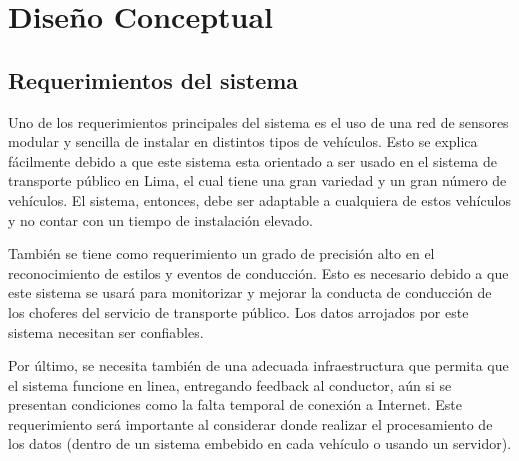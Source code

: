 \chapter{Diseño Conceptual}

\ifpdf
    \graphicspath{{Chapter3/Figuras/}{Chapter3/Figs/PDF/}{Chapter3/Figs/}}
\else
    \graphicspath{{Chapter3/Figs/Vector/}{Chapter3/Figs/}}
\fi

\section{Requerimientos del sistema}
Uno de los requerimientos principales del sistema es el uso de una red de sensores modular y sencilla de instalar en distintos tipos de vehículos. Esto se explica fácilmente debido a que este sistema esta orientado a ser usado en el sistema de transporte público en Lima, el cual tiene una gran variedad y un gran número de vehículos. El sistema, entonces, debe ser adaptable a cualquiera de estos vehículos y no contar con un tiempo de instalación elevado.

También se tiene como requerimiento un grado de precisión alto en el reconocimiento de estilos y eventos de conducción. Esto es necesario debido a que este sistema se usará para monitorizar y mejorar la conducta de conducción de los choferes del servicio de transporte público. Los datos arrojados por este sistema necesitan ser confiables.

Por último, se necesita también de una adecuada infraestructura que permita que el sistema funcione en linea, entregando feedback al conductor, aún si se presentan condiciones como la falta temporal de conexión a Internet. Este requerimiento será importante al considerar donde realizar el procesamiento de los datos (dentro de un sistema embebido en cada vehículo o usando un servidor).


